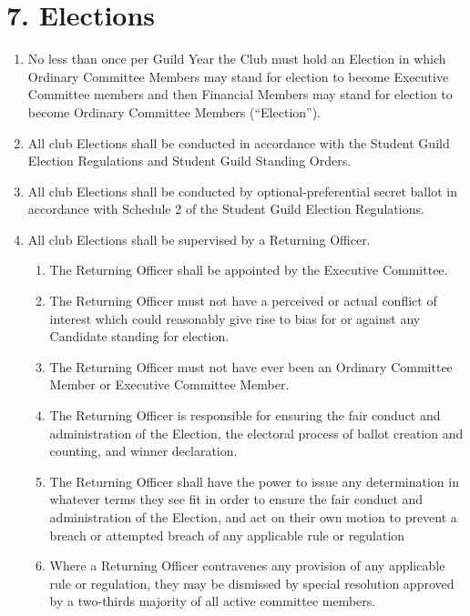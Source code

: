 \documentclass[12pt]{article}
\begin{document}
\section{7. Elections}
\begin{enumerate}[label=7.\arabic*]
\item No less than once per Guild Year the Club must hold an Election in which Ordinary
Committee Members may stand for election to become Executive Committee
members and then Financial Members may stand for election to become Ordinary
Committee Members (``Election'').

\item All club Elections shall be conducted in accordance with the Student Guild Election
Regulations and Student Guild Standing Orders.

\item All club Elections shall be conducted by optional-preferential secret ballot in
accordance with Schedule 2 of the Student Guild Election Regulations.

\item All club Elections shall be supervised by a Returning Officer.
  \begin{enumerate}[label=7.4.\arabic*]
    \item The Returning Officer shall be appointed by the Executive Committee.
    \item The Returning Officer must not have a perceived or actual conflict of interest
which could reasonably give rise to bias for or against any Candidate
standing for election.
    \item The Returning Officer must not have ever been an Ordinary Committee
Member or Executive Committee Member.
    \item The Returning Officer is responsible for ensuring the fair conduct and
administration of the Election, the electoral process of ballot creation and
counting, and winner declaration.
    \item The Returning Officer shall have the power to issue any determination in
whatever terms they see fit in order to ensure the fair conduct and
administration of the Election, and act on their own motion to prevent a
breach or attempted breach of any applicable rule or regulation
    \item Where a Returning Officer contravenes any provision of any applicable rule
or regulation, they may be dismissed by special resolution approved by a
two-thirds majority of all active committee members.
  \end{enumerate}
  

\end{enumerate}
\end{document}
